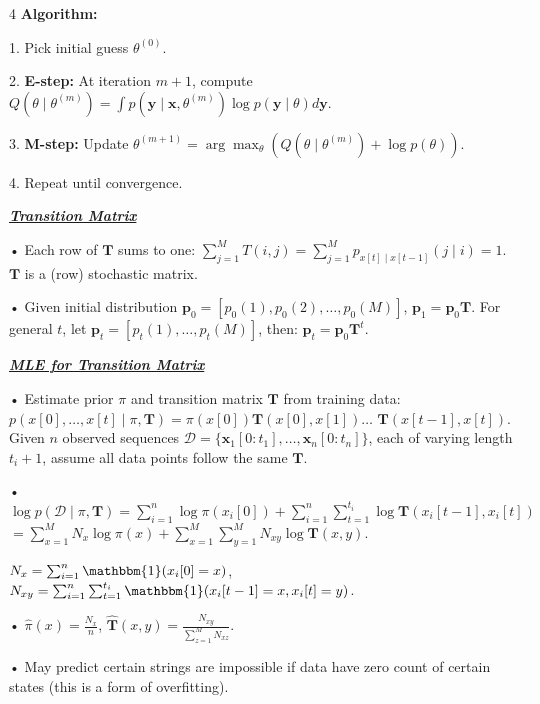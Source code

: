 \documentclass[10pt]{article}
\newcommand{\bulletPoint}[1]{\ul{\textit{\textbf{#1}}}}
\begin{document}
\begin{multicols*}{4}
\textbf{Algorithm:}

1. Pick initial guess $\theta^{(0)}$.

2. \textbf{E-step:} At iteration $m+1$, compute $Q(\theta \mid \theta^{(m)}) = \int p(\mathbf{y} \mid \mathbf{x}, \theta^{(m)}) \log p(\mathbf{y} \mid \theta) d\mathbf{y}$.

3. \textbf{M-step:} Update $\theta^{(m+1)} = \arg\max_{\theta} \left( Q(\theta \mid \theta^{(m)}) + \log p(\theta) \right)$.

4. Repeat until convergence. 

    


\bulletPoint{Transition Matrix}\quad

• Each row of $\mathbf{T}$ sums to one: $\sum_{j=1}^{M} T(i, j) = \sum_{j=1}^{M} p_{x[t] \mid x[t-1]}(j \mid i) = 1$.
$\mathbf{T}$ is a (row) stochastic matrix.

• Given initial distribution $\mathbf{p}_0 = [p_0(1), p_0(2), \dots, p_0(M)]$,  $\mathbf{p}_1 = \mathbf{p}_0 \mathbf{T}$. For general $t$, let $\mathbf{p}_t = [p_t(1), \dots, p_t(M)]$, then: $\mathbf{p}_t = \mathbf{p}_0 \mathbf{T}^t$.


\bulletPoint{MLE for Transition Matrix}\quad

• Estimate prior $\pi$ and transition matrix $\mathbf{T}$ from training data:
$p(x[0], \dots, x[t] \mid \pi, \mathbf{T}) = \pi(x[0]) \mathbf{T}(x[0], x[1])  \dots$ $\mathbf{T}(x[t-1], x[t])$.
Given $n$ observed sequences $\mathcal{D} = \{\mathbf{x}_1[0:t_1], \dots, \mathbf{x}_n[0:t_n]\}$, each of varying length $t_i+1$, assume all data points follow the same $\mathbf{T}$. 

• $\log p(\mathcal{D} \mid \pi, \mathbf{T}) = \sum_{i=1}^{n} \log \pi(x_i[0]) + \sum_{i=1}^{n} \sum_{t=1}^{t_i} \log \mathbf{T}(x_i[t-1], x_i[t])$
$= \sum_{x=1}^{M} N_x \log \pi(x) + \sum_{x=1}^{M} \sum_{y=1}^{M} N_{xy} \log \mathbf{T}(x, y)$. 

$N_x = \sum_{i=1}^{n} \mathbbm{1}(x_i[0] = x)$, $N_{xy} = \sum_{i=1}^{n} \sum_{t=1}^{t_i} \mathbbm{1}(x_i[t-1] = x, x_i[t] = y)$. 

• $\hat{\pi}(x) = \frac{N_x}{n}$, $\hat{\mathbf{T}}(x, y) = \frac{N_{xy}}{\sum_{z=1}^{M} N_{xz}}$. 
  
• May predict certain strings are impossible if data have zero count of certain states (this is a form of overfitting).


\end{multicols*}
\end{document}
